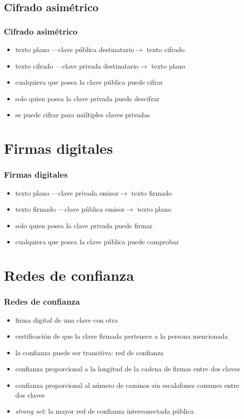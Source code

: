 \documentclass{beamer}
\let\olditem\item
\renewcommand{\item}{%
\olditem\vspace{3pt}}
\begin{document}
\subsection{Cifrado asimétrico}
\begin{frame}
\frametitle{Cifrado asimétrico}
\begin{itemize}
    \item texto plano {\tiny ---clave pública destinatario$\rightarrow$} texto
        cifrado
    \item texto cifrado {\tiny ---clave privada destinatario$\rightarrow$} texto
        plano
    \item cualquiera que posea la clave pública puede cifrar
    \item solo quien posea la clave privada puede descifrar
    \item se puede cifrar para múltiples claves privadas
\end{itemize}
\end{frame}


\section{Firmas digitales}
\begin{frame}
\frametitle{Firmas digitales}
\begin{itemize}
    \item texto plano {\tiny ---clave privada emisor$\rightarrow$} texto firmado
    \item texto firmado {\tiny ---clave pública emisor$\rightarrow$} texto plano
    \item solo quien posea la clave privada puede firmar
    \item cualquiera que posea la clave pública puede comprobar
\end{itemize}
\end{frame}


\section{Redes de confianza}
\begin{frame}
\frametitle{Redes de confianza}
\begin{itemize}
    \item firma digital de una clave con otra
    \item certificación de que la clave firmada pertenece a la persona
        mencionada
    \item la confianza puede ser transitiva: red de confianza
    \item confianza proporcional a la longitud de la cadena de firmas entre dos
        claves
    \item confianza proporcional al número de caminos sin escalafones comunes
        entre dos claves
    \item \emph{strong set}: la mayor red de confianza interconectada pública
\end{itemize}
\end{frame}
\end{document}
